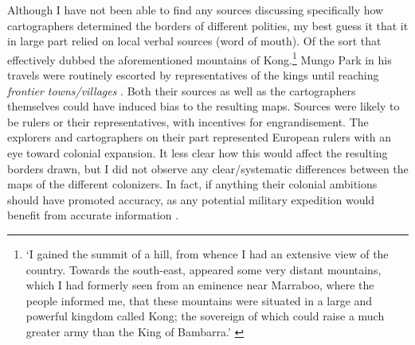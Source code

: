 \documentclass[12pt]{article}
\begin{document}
Although I have not been able to find any sources discussing specifically how
cartographers determined the borders of different polities, my best guess it
that it in large part relied on local verbal sources (word of mouth). Of the
sort that effectively dubbed the aforementioned mountains of Kong.\footnote{`I
	gained the summit of a hill, from whence I had an extensive view of the
	country. Towards the south-east, appeared some very distant mountains,
	which I had formerly seen from an eminence near Marraboo, where the
people informed me, that these mountains were situated in a large and powerful
kingdom called Kong; the sovereign of which could raise a much greater army than
the King of Bambarra.' \citep[CHAPTER XVIII]{ParkMungo2015Titi}} Mungo Park in
his travels were routinely escorted by representatives of the kings until
reaching \textit{frontier towns/villages} \citep{ParkMungo2015Titi}. Both their
sources as well as the cartographers themselves could have induced bias to the
resulting maps. Sources were likely to be rulers or their representatives, with
incentives for engrandisement. The explorers and cartographers on their part
represented European rulers with an eye toward colonial expansion. It less clear
how this would affect the resulting borders drawn, but I did not observe any
clear/systematic differences between the maps of the different colonizers. In
fact, if anything their colonial ambitions should have promoted accuracy, as any
potential military expedition would benefit from accurate information
\citep{Bassett_1994}.
\end{document}
